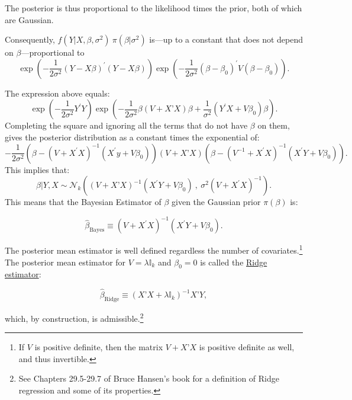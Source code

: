 \documentclass[11pt]{article} %
\begin{document}
\noindent The posterior is thus proportional to the likelihood times the prior, both of which are Gaussian. 

\noindent Consequently, $f(Y | X, \beta, \sigma^2 )\:  \pi(\beta | \sigma^2 )$ is---up to a constant that does not depend on $\beta$---proportional to
\begin{equation} \label{equation:posterior}
\exp \left( -\frac{1}{2\sigma^2} (Y-X\beta)^{\prime} (Y-X \beta) \right)  \exp \left(-\frac{1}{2 \sigma^2} (\beta-\beta_0)^{\prime} V (\beta-\beta_0) \right). 
\end{equation}

\noindent The expression above equals:
\[ \exp \left( -\frac{1}{2\sigma^2} Y^{\prime} Y \right) \exp \left(  - \frac{1}{2 \sigma^2 } \beta \left(V + X’X \right) \beta + \frac{1}{\sigma^2}(Y^{\prime} X+V\beta_0) \beta \right). \]
Completing the square and ignoring all the terms that do not have $\beta$ on them, gives the posterior distribution as a constant times the exponential of:
\begin{equation*}
-\frac{1}{2 \sigma^2} \left( \beta -  \left( V + X^{\prime} X \right)^{-1} (X^{\prime} y+ V \beta_0) \right) \left(V+ X’X \right) \left(\beta -  ( V^{-1} + X^{\prime} X )^{-1} (X^{\prime} Y+ V \beta_0) \right). 
\end{equation*}
This implies that:
\begin{equation}
\beta | Y, X \sim \mathcal{N}_{k} \left(  \left( V + X’X \right)^{-1} (X^{\prime} Y+V\beta_0) \: , \:   \sigma^2 \left(V + X^{\prime} X \right)^{-1}   \right).
\end{equation}
This means that the Bayesian Estimator of $\beta$ given the Gaussian prior $\pi(\beta)$ is:

\[ \widehat{\beta}_{\textrm{Bayes}} \equiv \left( V + X^{\prime} X \right)^{-1} \left( X^{\prime} Y + V \beta_0 \right). \]

\noindent The posterior mean estimator is well defined regardless the number of
covariates.\footnote{If $V$ is positive definite, then the matrix $V+ X’X$ is
  positive definite as well, and thus invertible.} The posterior mean estimator
for $V= \lambda \mathbb{I}_{k}$ and $\beta_0 = 0$ is called the \underline{Ridge estimator}:

\[  \widehat{\beta}_{\textrm{Ridge}} \equiv (X’X + \lambda \mathbb{I}_{k})^{-1} X’Y, \]

\noindent which, by construction, is admissible.\footnote{See Chapters 29.5-29.7 of Bruce Hansen's book for a definition of Ridge regression and some of its properties.} 
\end{document}
